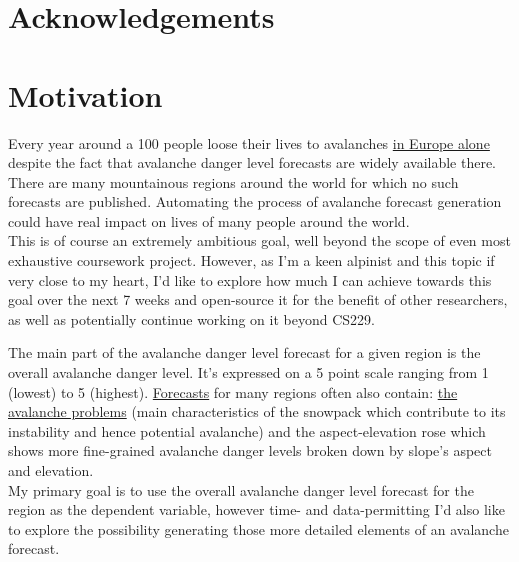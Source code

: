 \documentclass{article}
\begin{document}
\section*{Acknowledgements}

\section{Motivation}

	Every year around a 100 people loose their lives to avalanches \href{https://www.avalanches.org/fatalities/}{in Europe alone} despite the fact that avalanche danger level forecasts are widely available there. There are many mountainous regions around the world for which no such forecasts are published.
	Automating the process of avalanche forecast generation could have real impact on lives of many people around the world. \\
	This is of course an extremely ambitious goal, well beyond the scope of even most exhaustive coursework project. However, as I'm a keen alpinist and this topic if very close to my heart, I'd like to explore how much I can achieve towards this goal over the next 7 weeks and open-source it for the benefit of other researchers, as well as potentially continue working on it beyond CS229.

	The main part of the avalanche danger level forecast for a given region is the overall avalanche danger level. It's expressed on a 5 point scale ranging from 1 (lowest) to 5 (highest).	\href{https://www.shastaavalanche.org/page/how-read-advisory}{Forecasts} for many regions often also contain: \href{https://avalanche.state.co.us/forecasts/tutorial/avalanche-problems}{the avalanche problems} (main characteristics of the snowpack which contribute to its instability and hence potential avalanche) and the aspect-elevation rose which shows more fine-grained avalanche danger levels broken down by slope's aspect and elevation. \\
	My primary goal is to use the overall avalanche danger level forecast for the region as the dependent variable, however time- and data-permitting I'd also like to explore the possibility generating those more detailed elements of an avalanche forecast.	
	
\end{document}
